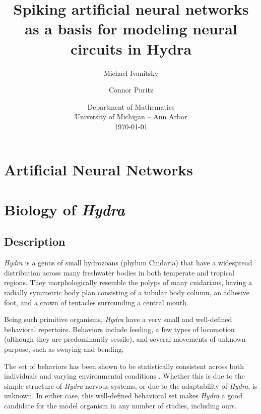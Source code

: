 \documentclass{article}
\begin{document}
\title{Spiking artificial neural networks as a basis for modeling neural circuits in Hydra}

\author{Michael Ivanitsky \and Connor Puritz}
\date{%
    Department of Mathematics\\ University of Michigan -- Ann Arbor\\[2ex]%
    \today
}

\maketitle

\begin{abstract}

\end{abstract}

\section{Artificial Neural Networks}
\newpage

\section{Biology of \textit{Hydra}}
\subsection{Description}
\label{subsection:description}
\textit{Hydra} is a genus of small hydrozoans (phylum Cnidaria) that have a widespread distribution across many freshwater bodies in both temperate and tropical regions. They morphologically resemble the polyps of many cnidarians, having a radially symmetric body plan consisting of a tubular body column, an adhesive foot, and a crown of tentacles surrounding a central mouth.

Being such primitive organisms, \textit{Hydra} have a very small and well-defined behavioral repertoire. Behaviors include feeding, a few types of locomotion (although they are predominantly sessile), and several movements of unknown purpose, such as swaying and bending.

The set of behaviors has been shown to be statistically consistent across both individuals and varying environmental conditions \cite{behavior}. Whether this is due to the simple structure of \textit{Hydra} nervous systems, or due to the adaptability of \textit{Hydra}, is unknown. In either case, this well-defined behavioral set makes \textit{Hydra} a good candidate for the model organism in any number of studies, including ours.
\end{document}
